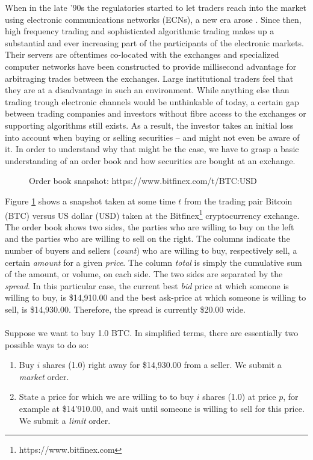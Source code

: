 When in the late '90s the regulatories started to let traders reach into the market using electronic communications networks (ECNs), a new era arose \cite{patterson2012dark}.
Since then, high frequency trading and sophisticated algorithmic trading makes up a substantial and ever increasing part of the participants of the electronic markets. 
Their servers are oftentimes co-located with the exchanges and specialized computer networks have been constructed to provide millisecond advantage for arbitraging trades between the exchanges. 
Large institutional traders feel that they are at a disadvantage in such an environment. \cite{patterson2012dark}
While anything else than trading trough electronic channels would be unthinkable of today, a certain gap between trading companies and investors without fibre access to the exchanges or supporting algorithms still exists.
As a result, the investor takes an initial loss into account when buying or selling securities -- and might not even be aware of it.
In order to understand why that might be the case, we have to grasp a basic understanding of an order book and how securities are bought at an exchange.

\begin{figure}[H]
    \centering
    \caption{Order book snapshot: https://www.bitfinex.com/t/BTC:USD}
    \label{fig:intro-orderbook}
\end{figure}

Figure \ref{fig:intro-orderbook} shows a snapshot taken at some time $t$ from the trading pair Bitcoin (BTC) versus US dollar (USD) taken at the Bitfinex\footnote{https://www.bitfinex.com} cryptocurrency exchange.
The order book shows two sides, the parties who are willing to buy on the left and the parties who are willing to sell on the right.
The columns indicate the number of buyers and sellers (\textit{count}) who are willing to buy, respectively sell, a certain \textit{amount} for a given \textit{price}.
The column \textit{total} is simply the cumulative sum of the amount, or volume, on each side.
The two sides are separated by the \textit{spread}. 
In this particular case, the current best \textit{bid} price at which someone is willing to buy, is \$14,910.00 and the best ask-price at which someone is willing to sell, is \$14,930.00. 
Therefore, the spread is currently \$20.00 wide.
\\
\\
Suppose we want to buy 1.0 BTC.
In simplified terms, there are essentially two possible ways to do so:
\begin{enumerate}
    \item Buy $i$ shares (1.0) right away for \$14,930.00 from a seller. We submit a \textit{market} order.
    \item State a price for which we are willing to to buy $i$ shares (1.0) at price $p$, for example at \$14'910.00, and wait until someone is willing to sell for this price. We submit a \textit{limit} order.
\end{enumerate}

